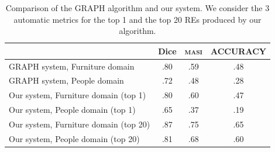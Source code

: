 \begin{table}[h!]
\begin{center}
\begin{tabular}{|l|c|c|c|}
\hline
	 	& 	Dice		&	\textsc{masi}	&	ACCURACY		\\
\hline
GRAPH system, Furniture domain	& 	.80 		&	.59	&	.48		 	\\
GRAPH system, People domain 	& 	.72		&	.48	&	.28			\\
\hline
Our system, Furniture domain (top 1)	&	.80		&	.60	&	.47		\\
Our system, People domain (top 1)	&	.65		&	.37	&	.19		\\
\hline
Our system, Furniture domain (top 20)&	.87		&	.75  	&	.65		\\
Our system, People domain (top 20)   &	.81		&	.68	&	.60		\\
\hline
\end{tabular}
\caption{Comparison of the GRAPH algorithm and our system. We consider the 3 automatic metrics for the top 1 and the top 20 REs produced by our algorithm.}
\vspace*{-.5cm}
\label{Tabla_sis_1_20}
\end{center}
\end{table}
\vspace*{-.5cm}



